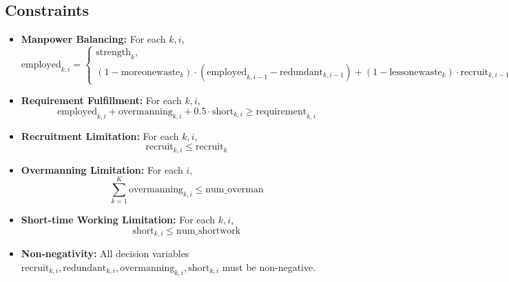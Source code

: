 \documentclass{article}
\begin{document}
\subsection*{Constraints}
\begin{itemize}
    \item \textbf{Manpower Balancing:} For each \( k, i \),
    \[
    \text{employed}_{k,i} = 
    \begin{cases} 
    \text{strength}_k, & i = 1 \\
    (1 - \text{moreonewaste}_k) \cdot (\text{employed}_{k,i-1} - \text{redundant}_{k,i-1}) + (1 - \text{lessonewaste}_k) \cdot \text{recruit}_{k,i-1}, & i > 1
    \end{cases}
    \]
    
    \item \textbf{Requirement Fulfillment:} For each \( k, i \),
    \[
    \text{employed}_{k,i} + \text{overmanning}_{k,i} + 0.5 \cdot \text{short}_{k,i} \geq \text{requirement}_{k,i}
    \]

    \item \textbf{Recruitment Limitation:} For each \( k, i \),
    \[
    \text{recruit}_{k,i} \leq \text{recruit}_k
    \]

    \item \textbf{Overmanning Limitation:} For each \( i \),
    \[
    \sum_{k=1}^{K} \text{overmanning}_{k,i} \leq \text{num\_overman}
    \]
    
    \item \textbf{Short-time Working Limitation:} For each \( k, i \),
    \[
    \text{short}_{k,i} \leq \text{num\_shortwork}
    \]

    \item \textbf{Non-negativity:} All decision variables \(\text{recruit}_{k,i}, \text{redundant}_{k,i}, \text{overmanning}_{k,i}, \text{short}_{k,i}\) must be non-negative.
\end{itemize}
\end{document}

